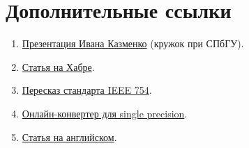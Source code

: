 \section{Дополнительные ссылки}

\begin{frame}
	\begin{enumerate}
		\item \href{http://acm.math.spbu.ru/~gassa/slides/number-representation.ru.pdf}{Презентация Ивана Казменко} (кружок при СПбГУ).
		\item \href{https://habrahabr.ru/post/112953/}{Статья на Хабре}.
		\item \href{http://www.softelectro.ru/ieee754.html}{Пересказ стандарта IEEE 754}.
		\item \href{https://www.h-schmidt.net/FloatConverter/IEEE754.html}{Онлайн-конвертер для single precision}.
		\item \href{http://steve.hollasch.net/cgindex/coding/ieeefloat.html}{Статья на английском}.
	\end{enumerate}
\end{frame}
